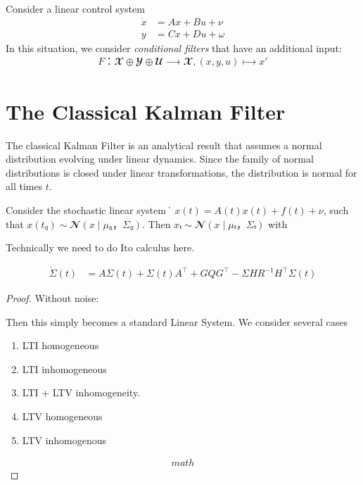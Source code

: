 \documentclass[10pt]{article}
\begin{document}
\begin{example}

Consider a linear control system
%
\begin{align*}%
\dot{x} &= Ax + Bu + ν \\%
y &= Cx + Du + ω
\end{align*}%
%
In this situation, we consider \emph{conditional filters} that have an additional input:
%
\begin{align*}%
F：𝓧⊕𝓨⊕𝓤 ⟶ 𝓧, (x, y, u) ⟼ x' %
\end{align*}%
%
\end{example}



\section{The Classical Kalman Filter}

The classical Kalman Filter is an analytical result that assumes a normal distribution evolving under linear dynamics. Since the family of normal distributions is closed under linear transformations, the distribution is normal for all times $t$.

%
\begin{lemma}%
\label{lem: linear ODE normal}%

Consider the stochastic linear system $̇x(t) = A(t)x(t) + f(t) + ν$, such that $x(t₀)∼𝓝(x∣μ₀，Σ₀)$. Then $xₜ∼𝓝(x∣μₜ，Σₜ)$ with

Technically we  need to do Ito calculus here.



%
\begin{align*}%
\dot{Σ}(t) &= AΣ(t) + Σ(t)A^⊤ + GQG^⊤ - ΣHR^{-1}H^⊤Σ(t)%
\end{align*}%
%


\begin{proof}

Without noise:

Then this simply becomes a standard Linear System. We consider several cases


\begin{enumerate}%
	\item LTI homogeneous
	\item LTI inhomogeneous
	\item LTI + LTV inhomogeneity.
	\item LTV homogeneous
	\item LTV inhomogenous
\end{enumerate}%



\begin{align*}%
math%
\end{align*}%
%
\end{proof}
%






%
\end{lemma}%
\end{document}
